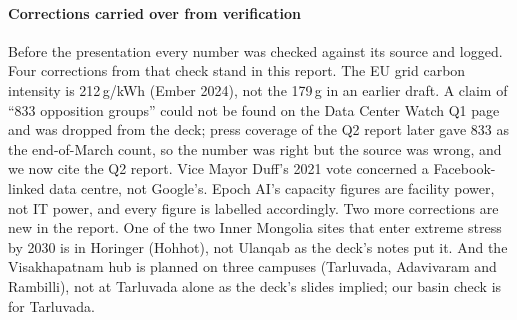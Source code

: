 \paragraph{Corrections carried over from verification} Before the presentation every number was checked against its
source and logged. Four corrections from that check stand in this report. The EU grid carbon intensity is 212\,g/kWh
(Ember 2024), not the 179\,g in an earlier draft. A claim of ``833 opposition groups'' could not be found on the Data
Center Watch Q1 page and was dropped from the deck; press coverage of the Q2 report later gave 833 as the end-of-March count,
so the number was right but the source was wrong, and we now cite the Q2 report. Vice Mayor Duff's 2021 vote concerned a Facebook-linked data centre, not Google's.
Epoch AI's capacity figures are facility power, not IT power, and every figure is labelled accordingly. Two more
corrections are new in the report. One of the two Inner Mongolia sites that enter extreme stress by 2030 is in Horinger
(Hohhot), not Ulanqab as the deck's notes put it. And the Visakhapatnam hub is planned on three campuses (Tarluvada,
Adavivaram and Rambilli), not at Tarluvada alone as the deck's slides implied; our basin check is for Tarluvada.
